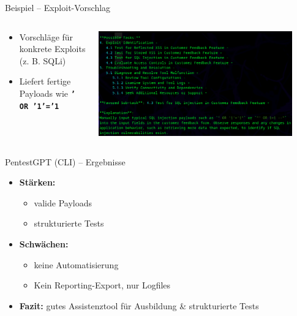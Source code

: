 \documentclass[
	aspectratio=169,	%
	onlytextwidth,		%
	t,					%
	]{beamer}
\begin{document}
\begin{frame}{Beispiel – Exploit-Vorschlag}
	\begin{columns}
		\begin{column}[T]{.4\textwidth}
			\begin{itemize}
				\item Vorschläge für konkrete Exploits (z. B. SQLi)
				\item Liefert fertige Payloads wie \textbf{\texttt{' OR '1'='1}}
			\end{itemize}
		\end{column}
		\begin{column}[T]{.6\textwidth}
			\centering
			
			\includegraphics[width=0.9\textwidth]{figures/13.png}
			\label{fig:13}
		\end{column}
	\end{columns}
\end{frame}


\begin{frame}{PentestGPT (CLI) – Ergebnisse}
	\begin{itemize}
		\item \textbf{Stärken:}
		\begin{itemize}
			\item valide Payloads
			\item strukturierte Tests
		\end{itemize}
		\vspace{2mm}
		\item \textbf{Schwächen:}
		\begin{itemize}
			\item keine Automatisierung
			\item Kein Reporting-Export, nur Logfiles
		\end{itemize}
		\vspace{2mm}
		\item \textbf{Fazit:}  
		gutes Assistenztool für Ausbildung \& strukturierte Tests
	\end{itemize}
\end{frame}
\end{document}
